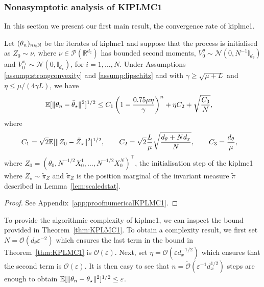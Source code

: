 \subsubsection{Nonasymptotic analysis of KIPLMC1}\label{sec:numericalKPLMC1}
In this section we present our first main result, the convergence rate of \gls*{kiplmc1}. 
\begin{theorem}\label{thm:KPLMC1} Let $(\theta_n)_{n\in{\mathbb N}}$ be the iterates of \gls*{kiplmc1} and suppose that the process is initialised as $Z_0\sim \nu$, where $\nu\in\mathcal{P}(\mathbb{R}^{d_z})$ has bounded second moments, $V^\theta_0\sim \mathcal{N}(0, N^{-1}\mathbb{I}_{d_\theta})$ and $V^{x_i}_0 \sim \mathcal{N}(0, \mathbb{I}_{d_x})$, for $i=1,\dots,N$. Under Assumptions \ref{assump:strongconvexity} and \ref{assump:lipschitz} and with $\gamma\geq \sqrt{\mu+L}$ and $\eta \leq \mu/(4\gamma L)$, we have
\begin{align*}
{\mathbb E}[\|\theta_n - \bar{\theta}_\star\|^2]^{1/2} &\leq C_1 \left(1-\frac{0.75\mu\eta}{\gamma}\right)^n + \eta C_2 + \sqrt{\frac{C_3}{N}},
\end{align*}
where
\begin{align*}
C_1 &= \sqrt{2} {\mathbb E}[\|Z_0 - \bar{Z}_\star\|^2]^{1/2},
\qquad C_2 = \sqrt{2}\frac{L}{\mu} \sqrt{\frac{d_\theta + N d_x}{N}}, \qquad
C_3 = \frac{d_\theta}{\mu},
\end{align*}
where $Z_0=(\theta_0, N^{-1/2} X^1_0,\dots, N^{-1/2} X^N_0)^\intercal$, the initialisation step of the \gls*{kiplmc1} where $\bar{Z}_\star\sim\widetilde\pi_Z$ and $\widetilde\pi_Z$ is the position marginal of the invariant measure $\widetilde\pi$ described in Lemma~\ref{lem:scaledstat}.
\end{theorem}
\begin{proof}
See Appendix~\ref{app:proofnumericalKPLMC1}.
\end{proof}

To provide the algorithmic complexity of \gls*{kiplmc1}, we can inspect the bound provided in Theorem~\ref{thm:KPLMC1}. To obtain a complexity result, we first set $N = \mathcal{O}(d_\theta \varepsilon^{-2})$ which ensures the last term in the bound in Theorem~\ref{thm:KPLMC1} is $\mathcal{O}(\varepsilon)$. Next, set $\eta = \mathcal{O}(\varepsilon d_x^{-1/2})$ which ensures that the second term is $\mathcal{O}(\varepsilon)$. It is then easy to see that $n = \widetilde{\mathcal{O}}(\varepsilon^{-1} d_x^{1/2})$ steps are enough to obtain ${\mathbb E}[\|\theta_n - \bar{\theta}_\star\|^2]^{1/2} \leq \varepsilon$.

